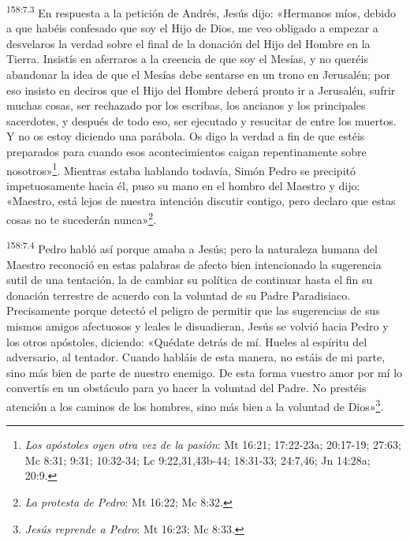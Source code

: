 \par
\textsuperscript{158:7.3} En respuesta a la petición de Andrés, Jesús dijo: «Hermanos míos, debido a que habéis confesado que soy el Hijo de Dios, me veo obligado a empezar a desvelaros la verdad sobre el final de la donación del Hijo del Hombre en la Tierra. Insistís en aferraros a la creencia de que soy el Mesías, y no queréis abandonar la idea de que el Mesías debe sentarse en un trono en Jerusalén; por eso insisto en deciros que el Hijo del Hombre deberá pronto ir a Jerusalén, sufrir muchas cosas, ser rechazado por los escribas, los ancianos y los principales sacerdotes, y después de todo eso, ser ejecutado y resucitar de entre los muertos. Y no os estoy diciendo una parábola. Os digo la verdad a fin de que estéis preparados para cuando esos acontecimientos caigan repentinamente sobre nosotros»\footnote{\textit{Los apóstoles oyen otra vez de la pasión}: Mt 16:21; 17:22-23a; 20:17-19; 27:63; Mc 8:31; 9:31; 10:32-34; Lc 9:22,31,43b-44; 18:31-33; 24:7,46; Jn 14:28a; 20:9.}. Mientras estaba hablando todavía, Simón Pedro se precipitó impetuosamente hacia él, puso su mano en el hombro del Maestro y dijo: «Maestro, está lejos de nuestra intención discutir contigo, pero declaro que estas cosas no te sucederán nunca»\footnote{\textit{La protesta de Pedro}: Mt 16:22; Mc 8:32.}.

\par
\textsuperscript{158:7.4} Pedro habló así porque amaba a Jesús; pero la naturaleza humana del Maestro reconoció en estas palabras de afecto bien intencionado la sugerencia sutil de una tentación, la de cambiar su política de continuar hasta el fin su donación terrestre de acuerdo con la voluntad de su Padre Paradisiaco. Precisamente porque detectó el peligro de permitir que las sugerencias de sus mismos amigos afectuosos y leales le disuadieran, Jesús se volvió hacia Pedro y los otros apóstoles, diciendo: «Quédate detrás de mí. Hueles al espíritu del adversario, al tentador. Cuando habláis de esta manera, no estáis de mi parte, sino más bien de parte de nuestro enemigo. De esta forma vuestro amor por mí lo convertís en un obstáculo para yo hacer la voluntad del Padre. No prestéis atención a los caminos de los hombres, sino más bien a la voluntad de Dios»\footnote{\textit{Jesús reprende a Pedro}: Mt 16:23; Mc 8:33.}.

